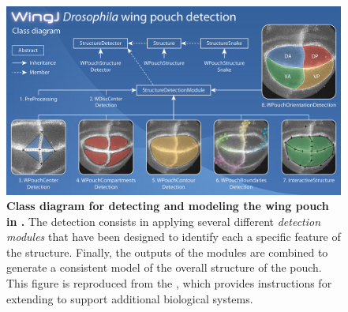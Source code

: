 \begin{figure}[!h]
\centering
\includegraphics[scale=0.32]{images/wingj-wpouch-diagram-720p.jpg}
\caption{\textbf{Class diagram for detecting and modeling the \droso wing pouch in \wingj.} The detection consists in applying several different \textit{detection modules} that have been designed to identify each a specific feature of the structure. Finally, the outputs of the modules are combined to generate a consistent model of the overall structure of the pouch. This figure is reproduced from the \wingjDeveloperGuide, which provides instructions for extending \wingj to support additional biological systems.}
\label{fig:wingj_wpouch_detection_modules}
\end{figure}

